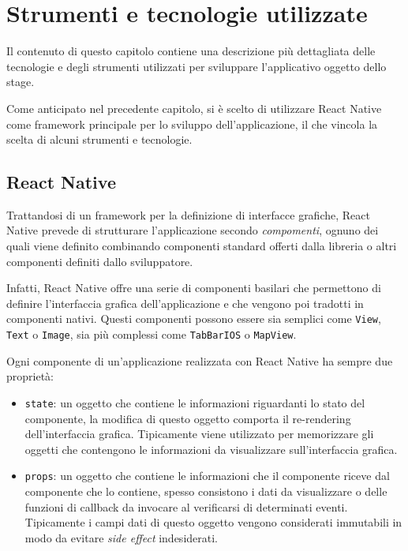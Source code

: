 
\chapter{Strumenti e tecnologie utilizzate}
\label{cap:strumenti-tecnologie}

Il contenuto di questo capitolo contiene una descrizione più dettagliata delle tecnologie e degli strumenti utilizzati per sviluppare l'applicativo oggetto dello stage.

Come anticipato nel precedente capitolo, si è scelto di utilizzare React Native come framework principale per lo sviluppo dell'applicazione, il che vincola la scelta di alcuni strumenti e tecnologie.

\section{React Native}

Trattandosi di un framework per la definizione di interfacce grafiche, React Native prevede di strutturare l'applicazione secondo \textit{compomenti}, ognuno dei quali viene definito combinando componenti standard offerti dalla libreria o altri componenti definiti dallo sviluppatore.

Infatti, React Native offre una serie di componenti basilari che permettono di definire l'interfaccia grafica dell'applicazione e che vengono poi tradotti in componenti nativi. Questi componenti possono essere sia semplici come \texttt{View}, \texttt{Text} o \texttt{Image}, sia più complessi come \texttt{TabBarIOS} o \texttt{MapView}.

Ogni componente di un'applicazione realizzata con React Native ha sempre due proprietà:
\begin{itemize}
\item \texttt{state}: un oggetto che contiene le informazioni riguardanti lo stato del componente, la modifica di questo oggetto comporta il re-rendering dell'interfaccia grafica. Tipicamente viene utilizzato per memorizzare gli oggetti che contengono le informazioni da visualizzare sull'interfaccia grafica.
\item \texttt{props}: un oggetto che contiene le informazioni che il componente riceve dal componente che lo contiene, spesso consistono i dati da visualizzare o delle funzioni di callback da invocare al verificarsi di determinati eventi. Tipicamente i campi dati di questo oggetto vengono considerati immutabili in modo da evitare \textit{side effect} indesiderati.
\end{itemize}

